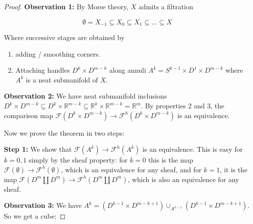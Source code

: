 \documentclass{article}
\newtheorem{proposed work}[theorem]{Proposed Work}
\theoremstyle{definition}
\begin{document}
\begin{proof}

\textbf{Observation 1:} By Morse theory, $X$ admits a filtration

\[ \emptyset  = X_{-1} \subseteq X_0 \subseteq X_1 \subseteq \dots \subseteq X \]

Where successive stages are obtained by

\begin{enumerate}
\item adding / smoothing corners.
\item Attaching handles $D^k \times D^{m-k}$ along annuli $A^k = S^{k-1} \times D^1 \times D^{m-k}$ where $A^k$ is a neat submanifold of $X$.
\end{enumerate}

\textbf{Observation 2:} We have neat submanifold inclusions $D^k \times D^{m-k} \subseteq D^k \times \mathbb R^{m-k} \subseteq \mathbb R^k \times \mathbb R^{m-k} = \mathbb R^m$. By properties 2 and 3, the comparison map $\mathcal F(D^k \times D^{m-k}) \to \mathcal F^h(D^k \times D^{m-k})$ is an equivalence.

Now we prove the theorem in two steps:

\textbf{Step 1:} We show that $\mathcal F(A^k) \to \mathcal F^h(A^k)$ is an equivalence. This is easy for $k=0,1$ simply by the sheaf property: for $k=0$ this is the map $\mathcal F(\emptyset) \to \mathcal F^h(\emptyset)$, which is an equivalence for any sheaf, and for $k=1$, it is the map $\mathcal F(D^m \amalg D^m) \to \mathcal F^h(D^m \amalg D^m)$, which is also an equivalence for any sheaf.

\textbf{Observation 3:} We have $A^k = (D^{k-1} \times D^{m-k+1}) \cup_{A^{k-1}} (D^{k-1} \times D^{m-k+1})$. So we get a cube:



\end{proof}
\end{document}
